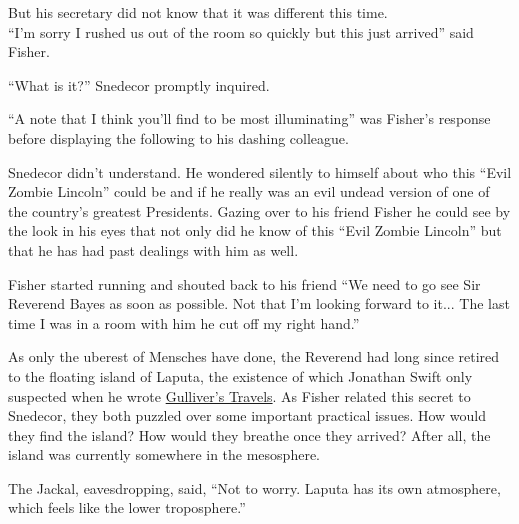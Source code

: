 \documentclass{article}
\begin{document}
But his secretary did not know that it was different this time.\\


``I'm sorry I rushed us out of the room so quickly but this just arrived'' said Fisher. 

``What is it?'' Snedecor promptly inquired.

``A note that I think you'll find to be most illuminating'' was Fisher's response before displaying the following to his dashing colleague.


\Fontauri
\Large 
\begin{center}
\end{center}


\normalfont
\normalsize
\vspace{.5in}

Snedecor didn't understand.  He wondered silently to himself about who this ``Evil Zombie Lincoln'' could be and if he really was an evil undead version of one of the country's greatest Presidents.  Gazing over to his friend Fisher he could see by the look in his eyes that not only did he know of this ``Evil Zombie Lincoln'' but that he has had past dealings with him as well.

Fisher started running and shouted back to his friend ``We need to go see Sir Reverend Bayes as soon as possible.  Not that I'm looking forward to it... The last time I was in a room with him he cut off my right hand.''


As only the uberest of Mensches have done, the Reverend had long since retired to the floating island of Laputa, the existence of which Jonathan Swift only suspected when he wrote \underline{Gulliver's Travels}. As Fisher related this secret to Snedecor, they both puzzled over some important practical issues. How would they find the island? How would they breathe once they arrived? After all, the island was currently somewhere in the mesosphere. \newline

The Jackal, eavesdropping, said, ``Not to worry. Laputa has its own atmosphere, which feels like the lower troposphere.'' \newline
\end{document}
